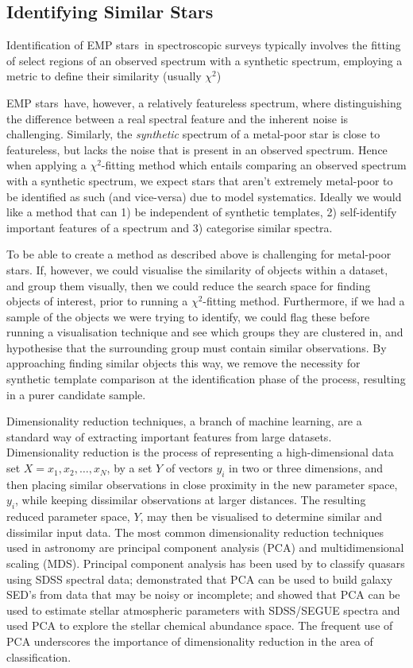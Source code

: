 \documentclass[]{aastex631}
\newcommand{\emps}{EMP stars\xspace}
\newcommand{\ci}{$\chi^2$\xspace}
\begin{document}
\subsection{Identifying Similar Stars}\label{sec:Identification}

Identification of \emps \ in spectroscopic surveys typically involves the fitting of select regions of an observed spectrum with a synthetic spectrum, employing a metric to define their similarity (usually \ci)


\emps \ have, however, a relatively featureless spectrum, where distinguishing the difference between a real spectral feature and the inherent noise is challenging. 
Similarly, the {\em synthetic} spectrum of a metal-poor star is close to featureless, but lacks the noise that is present in an observed spectrum. Hence when applying a \ci-fitting method which entails comparing an observed spectrum with a synthetic spectrum, we expect stars that aren't extremely metal-poor to be identified as such (and vice-versa) due to model systematics. Ideally we would like a method that can 1) be independent of synthetic templates, 2) self-identify important features of a spectrum and 3) categorise similar spectra. 

To be able to create a method as described above is challenging for metal-poor stars. If, however, we could visualise the similarity of objects within a dataset, and group them visually, then we could reduce the search space for finding objects of interest, prior to running a \ci-fitting method. Furthermore, if we had a sample of the objects we were trying to identify, we could flag these before running a visualisation technique and see which groups they are clustered in, and hypothesise that the surrounding group must contain similar observations.
By approaching finding similar objects this way, we remove the necessity for synthetic template comparison at the identification phase of the process, resulting in a purer candidate sample.

Dimensionality reduction techniques, a branch of machine learning, are a standard way of extracting important features from large datasets.
Dimensionality reduction is the process of representing a high-dimensional data set $X={x_{1}, x_{2},\ldots,x_{N}}$, by a set $Y$ of vectors $y_{i}$ in two or three dimensions, and then placing similar observations in close proximity in the new parameter space, $y_{i}$, while keeping dissimilar observations at larger distances. The resulting reduced parameter space, $Y$, may then be visualised to determine similar and dissimilar input data.
The most common dimensionality reduction techniques used in astronomy are principal component analysis (PCA) and multidimensional scaling (MDS). Principal component analysis has been used by \cite{yip_2004} to classify quasars using SDSS spectral data; \cite{connolly_1999} demonstrated that PCA can be used to build galaxy SED's from data that may be noisy or incomplete; and \cite{fioren_2007} showed that PCA can be used to estimate stellar atmospheric parameters with SDSS/SEGUE spectra and \citet{2012MNRAS.421.1231T} used PCA to explore the stellar chemical abundance space. The frequent use of PCA underscores the importance of dimensionality reduction in the area of classification. 
\end{document}
